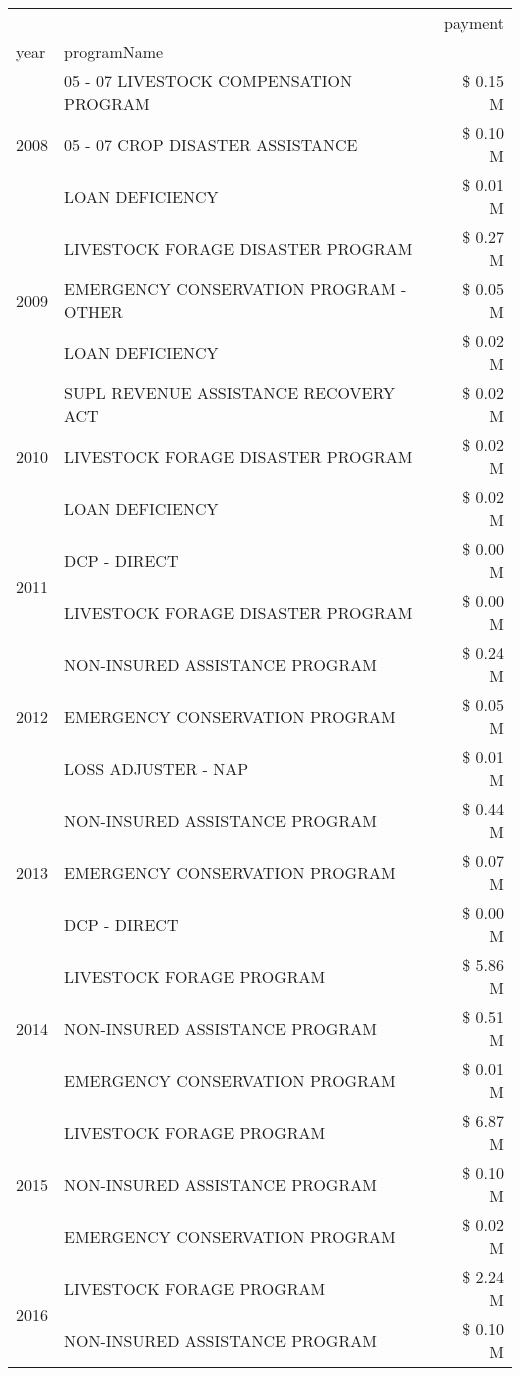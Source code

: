 \begin{tabular}{llr}
\toprule
 &  & payment \\
year & programName &  \\
\midrule
\multirow[t]{3}{*}{2008} & 05 - 07 LIVESTOCK COMPENSATION PROGRAM & \$ 0.15 M \\
 & 05 - 07 CROP DISASTER ASSISTANCE & \$ 0.10 M \\
 & LOAN DEFICIENCY & \$ 0.01 M \\
\cline{1-3}
\multirow[t]{3}{*}{2009} & LIVESTOCK FORAGE DISASTER  PROGRAM & \$ 0.27 M \\
 & EMERGENCY CONSERVATION PROGRAM - OTHER & \$ 0.05 M \\
 & LOAN DEFICIENCY & \$ 0.02 M \\
\cline{1-3}
\multirow[t]{3}{*}{2010} & SUPL REVENUE ASSISTANCE RECOVERY ACT & \$ 0.02 M \\
 & LIVESTOCK FORAGE DISASTER  PROGRAM & \$ 0.02 M \\
 & LOAN DEFICIENCY & \$ 0.02 M \\
\cline{1-3}
\multirow[t]{2}{*}{2011} & DCP - DIRECT & \$ 0.00 M \\
 & LIVESTOCK FORAGE DISASTER PROGRAM & \$ 0.00 M \\
\cline{1-3}
\multirow[t]{3}{*}{2012} & NON-INSURED ASSISTANCE PROGRAM & \$ 0.24 M \\
 & EMERGENCY CONSERVATION PROGRAM & \$ 0.05 M \\
 & LOSS ADJUSTER - NAP & \$ 0.01 M \\
\cline{1-3}
\multirow[t]{3}{*}{2013} & NON-INSURED ASSISTANCE PROGRAM & \$ 0.44 M \\
 & EMERGENCY CONSERVATION PROGRAM & \$ 0.07 M \\
 & DCP - DIRECT & \$ 0.00 M \\
\cline{1-3}
\multirow[t]{3}{*}{2014} & LIVESTOCK FORAGE PROGRAM & \$ 5.86 M \\
 & NON-INSURED ASSISTANCE PROGRAM & \$ 0.51 M \\
 & EMERGENCY CONSERVATION PROGRAM & \$ 0.01 M \\
\cline{1-3}
\multirow[t]{3}{*}{2015} & LIVESTOCK FORAGE PROGRAM & \$ 6.87 M \\
 & NON-INSURED ASSISTANCE PROGRAM & \$ 0.10 M \\
 & EMERGENCY CONSERVATION PROGRAM & \$ 0.02 M \\
\cline{1-3}
\multirow[t]{3}{*}{2016} & LIVESTOCK FORAGE PROGRAM & \$ 2.24 M \\
 & NON-INSURED ASSISTANCE PROGRAM & \$ 0.10 M \\

\end{tabular}
